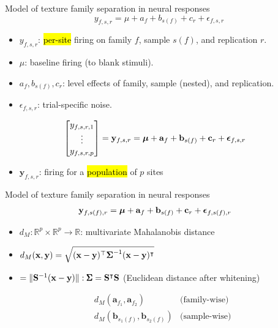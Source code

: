 \documentclass[aspectratio=169, handout]{beamer}
\begin{document}
\begin{frame}{Model of texture family separation in neural responses}
\[ y_{f, s, r} = \mu + a_f + b_{s(f)} + c_r + \epsilon_{f, s, r} \]
\begin{itemize}
    \item \( y_{f, s, r} \): \hl{per-site} firing on family \( f \), sample \( s (f) \), and replication \( r \). \pause  
    \item \( \mu \): baseline firing (to blank stimuli). \pause 
    \item \( a_f, b_{s(f)}, c_r \): level effects of family, sample (nested), and replication. \pause 
    \item \( \epsilon_{f, s, r }\): trial-specific noise. 
\end{itemize}
\begin{align*}
\begin{bmatrix} 
y_{f, s, r, 1} \\ 
\vdots \\
y_{f, s, r, p} 
\end{bmatrix} = \mathbf{y}_{f, s, r} &= \boldsymbol{ \mu } + \mathbf{a}_f + \mathbf{b}_{s(f)} + \mathbf{c}_r + \boldsymbol{ \epsilon }_{f, s, r}
\end{align*}
\begin{itemize}
    \item \( \mathbf{y}_{f, s, r} \): firing for a \hl{population} of \( p \) sites 
\end{itemize}
\end{frame}

\begin{frame}{Model of texture family separation in neural responses}
\begin{align*}
\mathbf{y}_{f, s(f), r} &= \boldsymbol{ \mu } + \mathbf{a}_f + \mathbf{b}_{s(f)} + \mathbf{c}_r + \boldsymbol{ \epsilon }_{f, s(f), r} 
\end{align*}
\begin{itemize}
    \item \( d_M: \mathbb{R}^p \times \mathbb{R}^p \to \mathbb{R} \): multivariate Mahalanobis distance \pause 
    \item \( d_M (\mathbf{x}, \mathbf{y}) = \sqrt{(\mathbf{x} - \mathbf{y})^\top \boldsymbol{ \Sigma }^{-1} (\mathbf{x} - \mathbf{y})^\intercal }\) \pause 
    \item \( = \| \mathbf{S}^{-1} (\mathbf{x} - \mathbf{y}) \|: \pmb\Sigma = \mathbf{S}^\intercal \mathbf{S}\)  (Euclidean distance after whitening) \pause 
\end{itemize}
\begin{align*} 
& d_M ( \mathbf{a}_{f_1},  \mathbf{a}_{f_2} )  &  \textrm{(family-wise)} \\
& d_M (\mathbf{b}_{s_1 (f)}, \mathbf{b}_{s_2 (f)}) & \textrm{(sample-wise)} 
\end{align*}
\end{frame}
\end{document}
